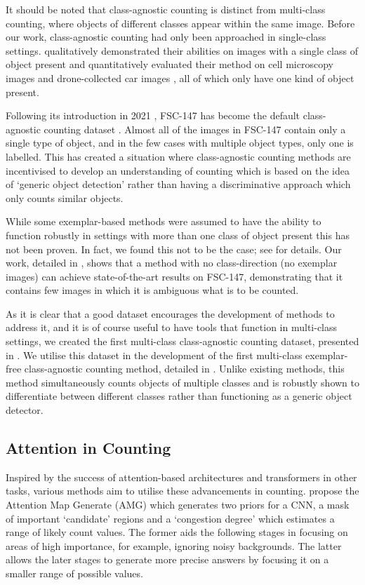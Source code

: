 \documentclass[../thesis.tex]{subfiles}
\begin{document}
It should be noted that class-agnostic counting is distinct from multi-class counting, where objects of different classes appear within the same image. Before our work, class-agnostic counting had only been approached in single-class settings. 
\citet{Lu18} qualitatively demonstrated their abilities on images with a single class of object present and quantitatively evaluated their method on cell microscopy images \cite{arteta2016detecting, lempitsky2010learning, lehmussola2007computational} and drone-collected car images \cite{hsieh2017drone}, all of which only have one kind of object present. 

Following its introduction in 2021 \cite{ranjan2021Famnet},  FSC-147 has become the default class-agnostic counting dataset \cite{ranjan2021Famnet, ranjan2022exemplar, liu2022countr, shi2022represent, lin2021object}.
Almost all of the images in FSC-147 contain only a single type of object, and in the few cases with multiple object types, only one is labelled.
This has created a situation where class-agnostic counting methods are incentivised to develop an understanding of counting which is based on the idea of `generic object detection' rather than having a discriminative approach which only counts similar objects.

While some exemplar-based methods were assumed to have the ability to function robustly in settings with more than one class of object present this has not been proven. In fact, we found this not to be the case; see  for details. Our work, detailed in , shows that a method with no class-direction (\ie no exemplar images) can achieve state-of-the-art results on FSC-147, demonstrating that it contains few images in which it is ambiguous what is to be counted.

As it is clear that a good dataset encourages the development of methods to address it, and it is of course useful to have tools that function in multi-class settings, we created the first multi-class class-agnostic counting dataset, presented in .
We utilise this dataset in the development of the first multi-class exemplar-free class-agnostic counting method, detailed in . 
Unlike existing methods, this method simultaneously counts objects of multiple classes and is robustly shown to differentiate between different classes rather than functioning as a generic object detector.


\subsection{Attention in Counting}
Inspired by the success of attention-based architectures and transformers in other tasks, various methods aim to utilise these advancements in counting.
\citet{liu2019adcrowdnet} propose the Attention Map Generate (AMG) which generates two priors for a CNN, a mask of important `candidate' regions and a `congestion degree' which estimates a range of likely count values. The former aids the following stages in focusing on areas of high importance, for example, ignoring noisy backgrounds. The latter allows the later stages to generate more precise answers by focusing it on a smaller range of possible values.
\end{document}
